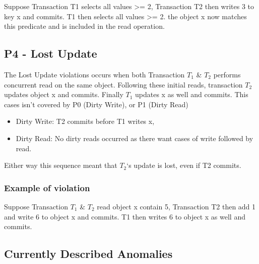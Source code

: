 \documentclass[a4paper,10pt,titlepage]{report}
\begin{document}
Suppose Transaction T1 selects all values >= 2, Transaction T2 then writes 3 to key x and commits. T1 then selects all values >= 2. the object x now matches this predicate and is included in the read operation. \\
\vspace{2mm}

\vspace{2mm}

\subsection{P4 - Lost Update}

The Lost Update violations occurs when both Transaction $T_1$ \& $T_2$ performs concurrent read on the same object. Following these initial reads, transaction $T_2$ updates object x and commits. Finally $T_1$ updates x as well and commits. 
This cases isn't covered by P0 (Dirty Write), or P1 (Dirty Read)
\begin{itemize}
    \item Dirty Write: T2 commits before T1 writes x,
    \item Dirty Read: No dirty reads occurred as there want cases of write followed by read.
\end{itemize}
Either way this sequence meant that $T_2$‘s update is lost, even if T2 commits.

\subsubsection{Example of violation}

Suppose Transaction $T_1$ \& $T_2$ read object x contain 5, Transaction T2 then add 1 and write 6 to object x and commits. T1 then writes 6 to object x as well and commits. \\
\vspace{2mm}

\vspace{2mm}


\newpage
\subsection{Currently Described Anomalies} 
\end{document}
